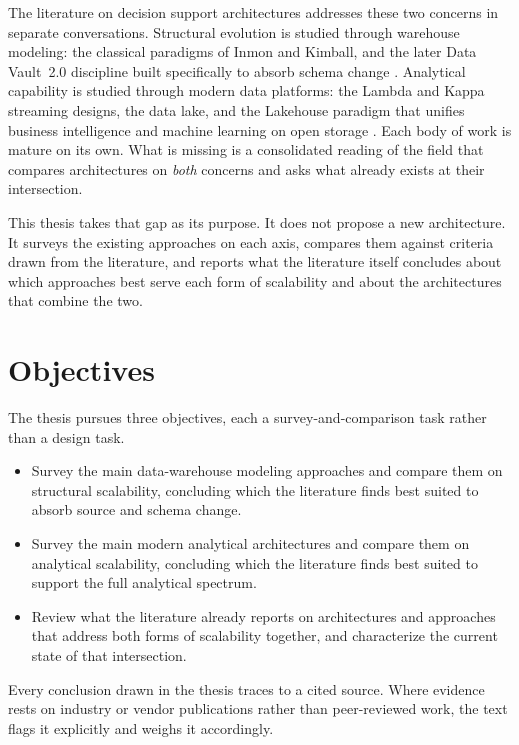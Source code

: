 The literature on decision support architectures addresses these two concerns in separate conversations. Structural evolution is studied through warehouse modeling: the classical paradigms of Inmon and Kimball, and the later Data Vault~2.0 discipline built specifically to absorb schema change \parencite{inmon2005, kimball2013, linstedt2015}. Analytical capability is studied through modern data platforms: the Lambda and Kappa streaming designs, the data lake, and the Lakehouse paradigm that unifies business intelligence and machine learning on open storage \parencite{marz2015, kreps2014, armbrust2021}. Each body of work is mature on its own. What is missing is a consolidated reading of the field that compares architectures on \textit{both} concerns and asks what already exists at their intersection.

This thesis takes that gap as its purpose. It does not propose a new architecture. It surveys the existing approaches on each axis, compares them against criteria drawn from the literature, and reports what the literature itself concludes about which approaches best serve each form of scalability and about the architectures that combine the two.

\section*{Objectives}
\label{sec:intro-objectives}

The thesis pursues three objectives, each a survey-and-comparison task rather than a design task.

\begin{itemize}[noitemsep, topsep=4pt]
  \item Survey the main data-warehouse modeling approaches and compare them on structural scalability, concluding which the literature finds best suited to absorb source and schema change.
  \item Survey the main modern analytical architectures and compare them on analytical scalability, concluding which the literature finds best suited to support the full analytical spectrum.
  \item Review what the literature already reports on architectures and approaches that address both forms of scalability together, and characterize the current state of that intersection.
\end{itemize}

\noindent Every conclusion drawn in the thesis traces to a cited source. Where evidence rests on industry or vendor publications rather than peer-reviewed work, the text flags it explicitly and weighs it accordingly.

